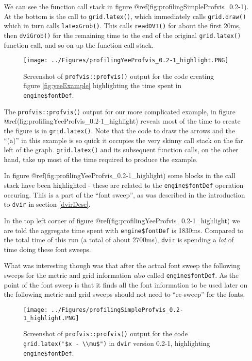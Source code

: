 \documentclass[]{article}
\begin{document}
We can see the function call stack in figure
@ref(fig:profilingSimpleProfvis\_0.2-1). At the bottom is the call to
\texttt{grid.latex()}, which immediately calls \texttt{grid.draw()}
which in turn calls \texttt{latexGrob()}. This calls \texttt{readDVI()}
for about the first 20ms, then \texttt{dviGrob()} for the remaining time
to the end of the original \texttt{grid.latex()} function call, and so
on up the function call stack.

\begin{figure}
\centering
\texttt{[image: ../Figures/profilingYeeProfvis\_0.2-1\_highlight.PNG]}
\caption{Screenshot of \texttt{profvis::profvis()} output for the code
creating figure \ref{fig:yeeExample} highlighting the time spent in
\texttt{engine\$fontDef}.}
\end{figure}

The \texttt{profvis::profvis()} output for our more complicated example,
in figure @ref(fig:profilingYeeProfvis\_0.2-1\_highlight) reveals most
of the time to create the figure is in \texttt{grid.latex()}. Note that
the code to draw the arrows and the ``(a)'' in this example is so quick
it occupies the very skinny call stack on the far left of the graph.
\texttt{grid.latex()} and its subsequent function calls, on the other
hand, take up most of the time required to produce the example.

In figure @ref(fig:profilingYeeProfvis\_0.2-1\_highlight) some blocks in
the call stack have been highlighted - these are related to the
\texttt{engine\$fontDef} operation occuring. This is a part of the
``font sweep'', as was described in the introduction to \texttt{dvir} in
section \ref{dvirDesc}.

In the top left corner of figure
@ref(fig:profilingYeeProfvis\_0.2-1\_highlight) we are told the
aggregate time spent with \texttt{engine\$fontDef} is 1830ms. Compared
to the total time of this run (a total of about 2700ms), \texttt{dvir}
is spending a \emph{lot} of time doing these font sweeps.

What was interesting though was that after the actual font sweep the
following sweeps for the metric and grid information \emph{also} called
\texttt{engine\$fontDef}. As the point of the font sweep is that it
finds all the font information to be used later on the following metric
and grid sweeps should not need to ``re-sweep'' for the fonts.

\begin{figure}
\centering
\texttt{[image: ../Figures/profilingSimpleProfvis\_0.2-1\_highlight.PNG]}
\caption{Screenshot of \texttt{profvis::profvis()} output for the code
\texttt{grid.latex("\$x\ -\ \textbackslash{}\textbackslash{}mu\$")} in
\texttt{dvir} version 0.2-1, highlighting \texttt{engine\$fontDef}.}
\end{figure}
\end{document}
